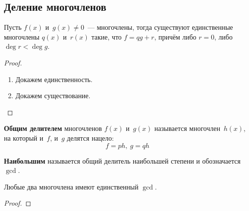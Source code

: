 \subsection{Деление многочленов}
\begin{theorem}
Пусть $f(x)$ и~$g(x) \neq 0$~--- многочлены, тогда существуют единственные многочлены $q(x)$ и~$r(x)$ такие, что $f = qg + r$, причём либо $r = 0$, либо $\deg r < \deg g$.
\end{theorem}
\begin{proof}
\begin{enumerate}
	\item Докажем единственность.
	
	\item Докажем существование.
	
\end{enumerate}
\end{proof}

\textbf{Общим делителем} многочленов $f(x)$ и~$g(x)$ называется многочлен~$h(x)$, на который и~$f$, и~$g$ делятся нацело:
\begin{equation*}
f = ph, \ g = qh
\end{equation*}

\textbf{Наибольшим} называется общий делитель наибольшей степени и обозначается $\gcd$.

\begin{theorem}
Любые два многочлена имеют единственный $\gcd$.
\end{theorem}
\begin{proof}

\end{proof}